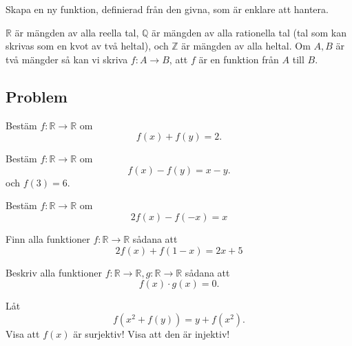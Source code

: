 \begin{tips}
	Skapa en ny funktion, definierad från den givna, som är enklare att hantera.
\end{tips}

\begin{obs}
	\(\mathbb{R} \) är mängden av alla reella tal, $\mathbb{Q}$ är mängden av alla rationella tal (tal som kan skrivas som en kvot av två heltal), och \(\mathbb{Z} \) är mängden av alla heltal. Om \(A, B\) är två mängder så kan vi skriva \(f: A \rightarrow B\), att \(f\) är en funktion från \(A\) till \(B\).
\end{obs}



\subsection{Problem}
\setcounter{theorem}{0}
\begin{problem}
	Bestäm \(f : \mathbb{R} \rightarrow \mathbb{R} \) om
	\[
		f(x) + f(y) = 2.
	\]
\end{problem}

\begin{problem}
	Bestäm \(f : \mathbb{R} \rightarrow \mathbb{R} \) om
	\[
		f(x) - f(y) = x-y.
	\]
	och \(f(3) = 6\).
\end{problem}

\begin{problem}
	Bestäm \(f : \mathbb{R} \rightarrow \mathbb{R} \) om
	\[
		2f(x) - f(-x) = x
	\]
\end{problem}
\begin{problem}
	Finn alla funktioner \(f: \mathbb{R} \rightarrow \mathbb{R} \) sådana att
	\[
		2 f(x) + f(1-x) = 2x + 5
	\]
\end{problem}

\begin{problem}
	Beskriv alla funktioner \(f: \mathbb{R} \rightarrow \mathbb{R}, g : \mathbb{R} \rightarrow \mathbb{R}  \) sådana att
	\[
		f(x) \cdot g(x) = 0.
	\]
\end{problem}

\begin{problem}
	Låt 
	\[
		f(x^2+ f(y)) = y + f(x^2).
	\]
	Visa att \(f(x)\) är surjektiv! Visa att den är injektiv!
\end{problem}



